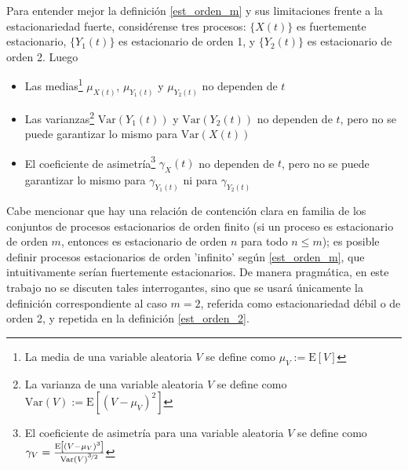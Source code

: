 \documentclass[12pt,a4paper]{mitthesis}
\newcommand{\E}[1]{\mathrm{E}\left[ #1 \right]}
\newcommand{\Var}[1]{\mathrm{Var}\left( #1 \right)}
\begin{document}
Para entender mejor la definici\'on \ref{est_orden_m} y sus limitaciones frente a la 
estacionariedad fuerte, consid\'erense tres procesos: $\{X(t)\}$ es fuertemente estacionario, 
$\{Y_1(t)\}$ es estacionario de orden 1, y $\{Y_2(t)\}$ es estacionario de orden 2. Luego
\begin{itemize}
\item Las medias\footnote{La media de una variable aleatoria $V$ se define como 
$ \mu_V := \E{V}$} 
$ \mu_{X(t)}$, $ \mu_{Y_1(t)}$ y $ \mu_{Y_2(t)}$ 
no dependen de $t$

\item Las varianzas\footnote{La varianza de una variable aleatoria $V$ se define como 
$ \Var{V} := \E{\left(V - \mu_V \right)^{2}}$} 
$ \Var{Y_1(t)}$ y $ \Var{Y_2(t)}$ no dependen de $t$, 
pero no se puede garantizar lo mismo para $\Var{X(t)}$

\item El coeficiente de asimetr\'ia\footnote{El coeficiente de asimetr\'ia %
para 
una variable aleatoria $V$ se define como 
$\gamma_V = \frac{\E{\left(V-\mu_V\right)^{3}}}{\Var{V}^{\nicefrac{3}{2}}}$}
$ \gamma_X(t)$ no dependen de $t$, pero no se puede garantizar lo mismo para
$ \gamma_{Y_1(t)}$ ni para $ \gamma_{Y_2(t)}$

\end{itemize}

Cabe mencionar que
hay una relaci\'on de contenci\'on clara en familia de los conjuntos de procesos 
estacionarios de orden finito (si un proceso es estacionario de orden $m$, entonces es estacionario 
de orden $n$ para todo $n \leq m$); es posible definir procesos estacionarios de 
orden 'infinito' seg\'un \ref{est_orden_m}, que intuitivamente ser\'ian fuertemente estacionarios. 
De manera pragm\'atica, en este trabajo no se discuten tales interrogantes, sino que se 
usar\'a \'unicamente la definici\'on correspondiente al caso %
$m=2$, referida como estacionariedad d\'ebil o de orden 2, y repetida en la definici\'on 
\ref{est_orden_2}.
\end{document}
